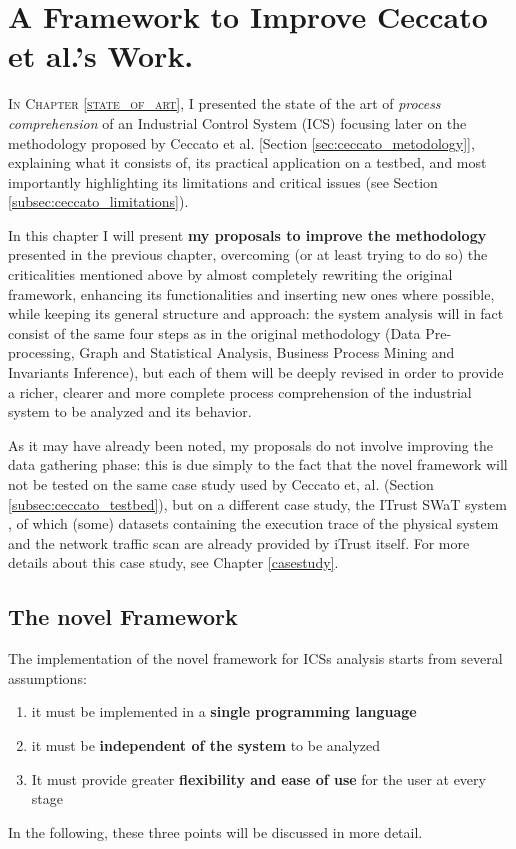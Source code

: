 \chapter{A Framework to Improve Ceccato et al.’s Work.}
\label{proposal}

\linenumbers
\lettrine[lines=2]{I}{n Chapter \ref{state_of_art}}, I presented the state of the art of \textit{process comprehension} of an Industrial Control System (ICS) focusing later on the methodology proposed by Ceccato et al. \cite{ceccato}[Section \ref{sec:ceccato_metodology}], explaining what it consists of, its practical application on a testbed, and most importantly highlighting its limitations and critical issues (see Section \ref{subsec:ceccato_limitations}).

\bigskip
In this chapter I will present \textbf{my proposals to improve the methodology} presented in the previous chapter, overcoming (or at least trying to do so) the criticalities mentioned above by almost completely rewriting the original framework, enhancing its functionalities and inserting new ones where possible, while keeping its general structure and approach: the system analysis will in fact consist of the same four steps as in the original methodology (Data Pre-processing, Graph and Statistical Analysis, Business Process Mining and Invariants Inference), but each of them will be deeply revised in order to provide a richer, clearer and more complete process comprehension of the industrial system to be analyzed and its behavior.

\bigskip
As it may have already been noted, my proposals do not involve improving the data gathering phase: this is due simply to the fact that the novel framework will not be tested on the same case study used by Ceccato et, al. (Section \ref{subsec:ceccato_testbed}), but on a different case study, the ITrust SWaT system \cite{swat_home}, of which (some) datasets containing the execution trace of the physical system and the network traffic scan are already provided by iTrust itself. For more details about this case study, see Chapter \ref{casestudy}.

\section{The novel Framework}
\label{sec:4_framework_presentation}
The implementation of the novel framework for ICSs analysis starts from several assumptions:

\begin{enumerate}
	\item it must be implemented in a \textbf{single programming language}
	\item it must be \textbf{independent of the system} to be analyzed
	\item It must provide greater \textbf{flexibility and ease of use} for the user at every stage
\end{enumerate}
In the following, these three points will be discussed in more detail.

